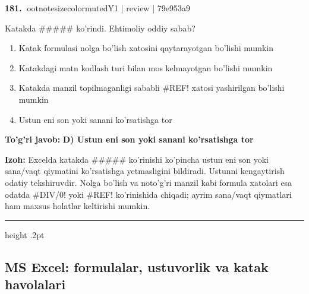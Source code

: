\documentclass[10pt,a4paper]{article}
\begin{document}
\textbf{\color{ink}181.} {ootnotesizecolor{muted}Y1 | review | 79e953a9}
\par
Katakda \#\#\#\#\# ko'rindi. Ehtimoliy oddiy sabab?
\begin{enumerate}[label=\Alph*),leftmargin=9mm]
\item Katak formulasi nolga bo'lish xatosini qaytarayotgan bo'lishi mumkin
\item Katakdagi matn kodlash turi bilan mos kelmayotgan bo'lishi mumkin
\item Katakda manzil topilmaganligi sababli \#REF! xatosi yashirilgan bo'lishi mumkin
\item Ustun eni son yoki sanani ko'rsatishga tor
\end{enumerate}
\begin{tcolorbox}[enhanced,breakable,colback=teal!4,colframe=teal!55!black,boxrule=0.45pt,arc=1.2mm,left=2.8mm,right=2.8mm,top=2mm,bottom=2mm]
\textbf{\color{teal}To'g'ri javob:} \textbf{D) Ustun eni son yoki sanani ko'rsatishga tor}
\par\smallskip
\textbf{Izoh:} Excelda katakda \#\#\#\#\# ko'rinishi ko'pincha ustun eni son yoki sana/vaqt qiymatini ko'rsatishga yetmasligini bildiradi. Ustunni kengaytirish odatiy tekshiruvdir. Nolga bo'lish va noto'g'ri manzil kabi formula xatolari esa odatda \#DIV/0! yoki \#REF! ko'rinishida chiqadi; ayrim sana/vaqt qiymatlari ham maxsus holatlar keltirishi mumkin.
\end{tcolorbox}
\vspace{2mm}\hrule height .2pt\vspace{2mm}
\subsection{MS Excel: formulalar, ustuvorlik va katak havolalari}
\end{document}
